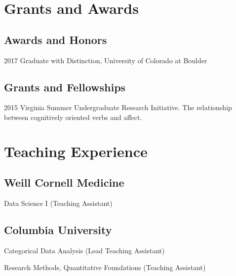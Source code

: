 \documentclass[12pt,letterpaper]{report}
\newcommand{\listitemspace}{0.15em}
\renewenvironment{itemize}
{\begin{list}{}{\setlength{\leftmargin}{0em}
            \setlength{\parskip}{0em}
            \setlength{\itemsep}{\listitemspace}
            \setlength{\parsep}{\listitemspace}}}
    {\end{list}}
\begin{document}
    \section*{Grants and Awards}

    \subsection*{Awards and Honors}

    \begin{tablist}

        \item[2017] \tab Graduate with Distinction, University of Colorado at Boulder

    \end{tablist}

    \subsection*{Grants and Fellowships}

    \begin{tablist}

        \item[2015] \tab Virginia Summer Undergraduate Research Initiative. The relationship between cognitively oriented verbs and affect.

    \end{tablist}

    \section*{Teaching Experience}
    
    \subsection*{Weill Cornell Medicine}
    
    \begin{itemize}
    
    	\item Data Science I (Teaching Assistant)
    
    \end{itemize}

    \subsection*{Columbia University}
    
    \begin{itemize}
    	
    	\item Categorical Data Analysis (Lead Teaching Assistant)
    	\item Research Methods, Quantitative Foundations (Teaching Assistant)
    
    \end{itemize}
\end{document}
